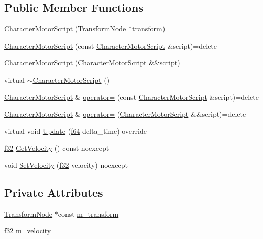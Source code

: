 \subsection*{Public Member Functions}
\begin{DoxyCompactItemize}
\item 
\hyperlink{classmage_1_1_character_motor_script_a3ec398d61411a1d8adaf330f00fdd7ea}{Character\+Motor\+Script} (\hyperlink{structmage_1_1_transform_node}{Transform\+Node} $\ast$transform)
\item 
\hyperlink{classmage_1_1_character_motor_script_aa8b4b2c6eba7077677db51e24c2a9a36}{Character\+Motor\+Script} (const \hyperlink{classmage_1_1_character_motor_script}{Character\+Motor\+Script} \&script)=delete
\item 
\hyperlink{classmage_1_1_character_motor_script_a04180b7c00a5c1c309fe8b1b44f6fd10}{Character\+Motor\+Script} (\hyperlink{classmage_1_1_character_motor_script}{Character\+Motor\+Script} \&\&script)
\item 
virtual \hyperlink{classmage_1_1_character_motor_script_a97b98828d964a0ce38cc424bbf080303}{$\sim$\+Character\+Motor\+Script} ()
\item 
\hyperlink{classmage_1_1_character_motor_script}{Character\+Motor\+Script} \& \hyperlink{classmage_1_1_character_motor_script_a5b66cbbe6b829fe56a1bba5f9093b36e}{operator=} (const \hyperlink{classmage_1_1_character_motor_script}{Character\+Motor\+Script} \&script)=delete
\item 
\hyperlink{classmage_1_1_character_motor_script}{Character\+Motor\+Script} \& \hyperlink{classmage_1_1_character_motor_script_a05e8822fa633d8642702d125b26069f7}{operator=} (\hyperlink{classmage_1_1_character_motor_script}{Character\+Motor\+Script} \&\&script)=delete
\item 
virtual void \hyperlink{classmage_1_1_character_motor_script_ac0ac58ac7a878c5dad5222e5af673179}{Update} (\hyperlink{namespacemage_ab935747c6941320bd6214b5a5f265b09}{f64} delta\+\_\+time) override
\item 
\hyperlink{namespacemage_a6a44ad388483959dc4dff9f2aef91431}{f32} \hyperlink{classmage_1_1_character_motor_script_ae3495d6cf8f0677dbe98196d4153ac8d}{Get\+Velocity} () const noexcept
\item 
void \hyperlink{classmage_1_1_character_motor_script_a1b466080fd5e8ce1ede87c767befb1bd}{Set\+Velocity} (\hyperlink{namespacemage_a6a44ad388483959dc4dff9f2aef91431}{f32} velocity) noexcept
\end{DoxyCompactItemize}
\subsection*{Private Attributes}
\begin{DoxyCompactItemize}
\item 
\hyperlink{structmage_1_1_transform_node}{Transform\+Node} $\ast$const \hyperlink{classmage_1_1_character_motor_script_ab73049127363ded0e6e8fb474b51794e}{m\+\_\+transform}
\item 
\hyperlink{namespacemage_a6a44ad388483959dc4dff9f2aef91431}{f32} \hyperlink{classmage_1_1_character_motor_script_a6ac864bc9681277223fda733e3243f53}{m\+\_\+velocity}
\end{DoxyCompactItemize}
